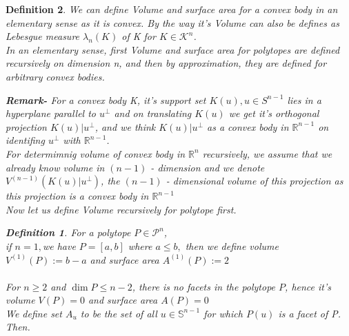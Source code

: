 \documentclass[oneside]{book}
\newtheorem{mydef}{Definition}
\begin{document}
\begin{mydef}
\normalfont

We can define Volume and surface area for a convex body in an elementary sense as it is convex. By the way it's Volume can also be defines as Lebesgue measure $\lambda_{n}(K)$ of K  for $ K \in  \mathcal{K}^{n} $. \\
In an elementary sense, first Volume and surface area for polytopes are defined recursively on dimension n, and then by approximation, they are defined for arbitrary convex bodies. \newline

\textbf{Remark-} 
For a convex body  K, it's support set $K(u),u \in S^{n-1} $ lies in a hyperplane parallel to 
$u^{\perp}$ and on translating $K(u)$ we get it's orthogonal projection $K(u) | u^{\perp}$, and we think  $K(u) | u^{\perp}$ as a convex body in $\mathbb{R}^{n-1}$  on identifing $u^{\perp}$ with $\mathbb{R}^{n-1}$. \\
  For determimnig volume of convex body in $\mathbb{R}^{n}$ recursively, we assume that we already  know volume in $(n-1)$ - dimension and we denote $V^{(n-1)}\left(K(u) | u^{\perp}\right)$, the $(n-1)$ - dimensional volume of this projection as this projection is a convex body in $\mathbb{R}^{n-1}$ 
\\
Now let us define Volume recursively for polytope first. 

  \begin{mydef} \label{14}
For a polytope $P \in \mathcal{P}^{n}$,\\
if  $n=1,$we have  $P=[a, b]$ where $a \leq b,$ then we define volume $V^{(1)}(P):=b-a$ and  surface area $A^{(1)}(P):=2$ 
\\\\
  For  $ n \geq 2  $ and $\operatorname{dim} P \leq n-2$, there is no facets in the polytope $P$, hence it's volume $V(P)=0$ and surface area $A(P)=0$ \\
  
 We define set $A_{{u}}$ to be the set of all $u \in \mathbb{S}^{n-1}$ for which $P(u)$ is a facet of P. Then. 


\end{mydef}
\end{mydef}
\end{document}

